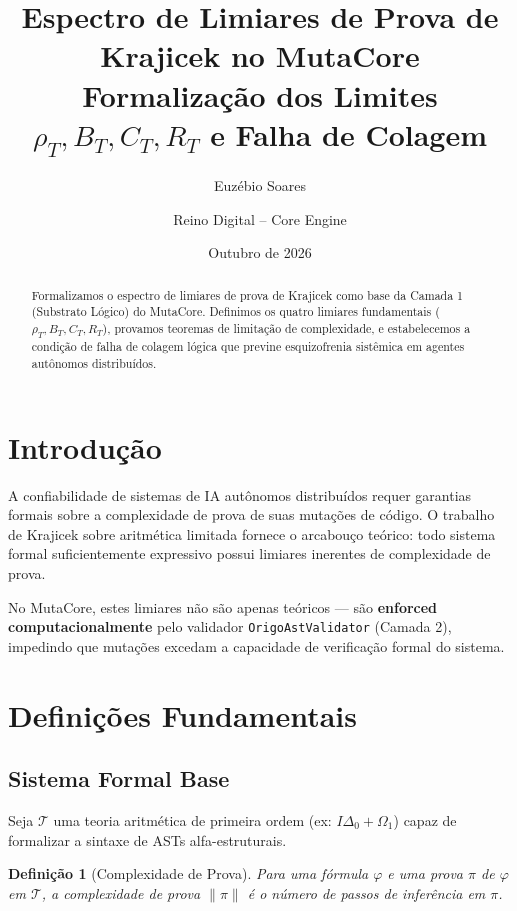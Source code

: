 \documentclass[11pt,a4paper]{article}
\title{
    \vspace{-1cm}
    \textbf{Espectro de Limiares de Prova de Krajicek no MutaCore}\\
    \large Formalização dos Limites $\rho_T, B_T, C_T, R_T$ e Falha de Colagem
}
\author{Euzébio Soares \and Reino Digital -- Core Engine}
\date{Outubro de 2026}
\newtheorem{definition}[theorem]{Definição}
\begin{document}
\maketitle

\begin{abstract}
Formalizamos o espectro de limiares de prova de Krajicek como base da Camada 1 (Substrato Lógico) do MutaCore. Definimos os quatro limiares fundamentais ($\rho_T, B_T, C_T, R_T$), provamos teoremas de limitação de complexidade, e estabelecemos a condição de falha de colagem lógica que previne esquizofrenia sistêmica em agentes autônomos distribuídos.
\end{abstract}

\tableofcontents
\newpage

\section{Introdução}

A confiabilidade de sistemas de IA autônomos distribuídos requer garantias formais sobre a complexidade de prova de suas mutações de código. O trabalho de Krajicek sobre aritmética limitada fornece o arcabouço teórico: todo sistema formal suficientemente expressivo possui limiares inerentes de complexidade de prova.

No MutaCore, estes limiares não são apenas teóricos — são \textbf{enforced computacionalmente} pelo validador \texttt{OrigoAstValidator} (Camada 2), impedindo que mutações excedam a capacidade de verificação formal do sistema.

\section{Definições Fundamentais}

\subsection{Sistema Formal Base}

Seja $\mathcal{T}$ uma teoria aritmética de primeira ordem (ex: $I\Delta_0 + \Omega_1$) capaz de formalizar a sintaxe de ASTs alfa-estruturais.

\begin{definition}[Complexidade de Prova]
Para uma fórmula $\varphi$ e uma prova $\pi$ de $\varphi$ em $\mathcal{T}$, a complexidade de prova $\|\pi\|$ é o número de passos de inferência em $\pi$.
\end{definition}
\end{document}
